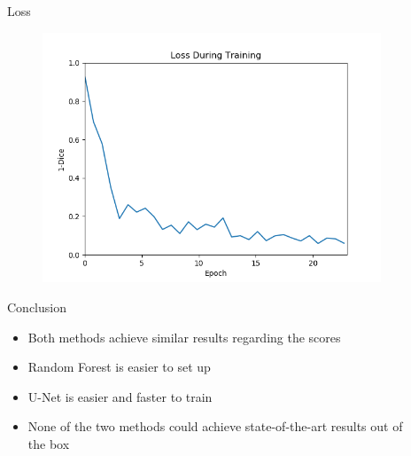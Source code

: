 \documentclass[final]{beamer}
\newlength{\sepwid}
\newlength{\onecolwid}
\newlength{\twocolwid}
\begin{document}
\begin{frame}[t]
\begin{columns}[t]
\begin{column}{\twocolwid}
\begin{columns}[t,totalwidth=\twocolwid]
\begin{column}{\onecolwid}

\end{column} %

\end{columns} %

\end{column} %

\begin{column}{\sepwid}\end{column} %

\begin{column}{\onecolwid} %


\begin{block}{Loss}
\begin{figure}
\includegraphics[width=0.9\linewidth]{trainingloss}
\end{figure}

\end{block}

\begin{block}{Conclusion}
\begin{itemize}[label={}]
\item Both methods achieve similar results regarding the scores
\item Random Forest is easier to set up
\item U-Net is easier and faster to train
\item None of the two methods could achieve state-of-the-art results out of the box
\end{itemize}
\end{block}


\end{column}
\end{columns}
\end{frame}
\end{document}
